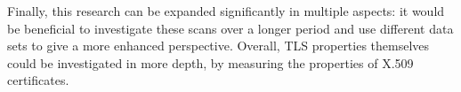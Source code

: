 Finally, this research can be expanded significantly in multiple aspects: it would be beneficial to investigate these scans over a longer period and use different data sets to give a more enhanced perspective. Overall, TLS properties themselves could be investigated in more depth, \ie by measuring the properties of X.509 certificates.
\fi



